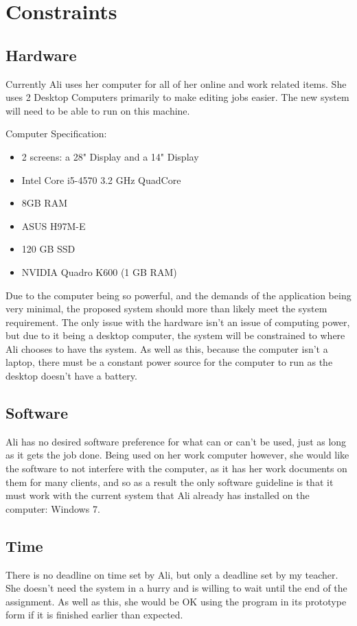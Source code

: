 
\section{Constraints}

\subsection{Hardware}
Currently Ali uses her computer for all of her online and work related items. She uses 2 Desktop Computers primarily to make editing jobs easier. The new system will need to be able to run on this machine.

Computer Specification:

\begin{itemize}
\item 2 screens: a 28" Display and a 14" Display
\item Intel Core i5-4570 3.2 GHz QuadCore
\item 8GB RAM
\item ASUS H97M-E
\item 120 GB SSD
\item NVIDIA Quadro K600 (1 GB RAM)
\end{itemize}

Due to the computer being so powerful, and the demands of the application being very minimal, the proposed system should more than likely meet the system requirement. The only issue with the hardware isn't an issue of computing power, but due to it being a desktop computer, the system will be constrained to where Ali chooses to have ths system. As well as this, because the computer isn't a laptop, there must be a constant power source for the computer to run as the desktop doesn't have a battery.

\subsection{Software}
Ali has no desired software preference for what can or can't be used, just as long as it gets the job done. Being used on her work computer however, she would like the software to not interfere with the computer, as it has her work documents on them for many clients, and so as a result the only software guideline is that it must work with the current system that Ali already has installed on the computer: Windows 7.

\subsection{Time}
There is no deadline on time set by Ali, but only a deadline set by my teacher. She doesn't need the system in a hurry and is willing to wait until the end of the assignment. As well as this, she would be OK using the program in its prototype form if it is finished earlier than expected.

